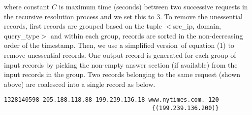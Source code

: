 \documentclass[11pt,a4paper]{article}
\newcommand{\resitem}[1]{\item #1 \vspace{-7pt}}
\begin{document}
where constant $C$ is maximum time (seconds) between two successive requests in the recursive resolution process and we set this to $3$.
\noindent
To remove the unessential records, first records are grouped based on the tuple $<$src\_ip, domain, query\_type$>$ and within each group, records are sorted in the non-decreasing order of the timestamp. Then, we use a simplified version\footnotemark \ of equation (1) to remove unessential records. One output record is generated for each group of input records by picking the non-empty answer section (if available) from the input records in the group. Two records belonging to the same request (shown above) are coalesced into a single record as below.
\begin{verbatim}
1328140598 205.188.118.88 199.239.136.18 www.nytimes.com. 120 
                                          {(199.239.136.200)}
\end{verbatim}


\end{document}
